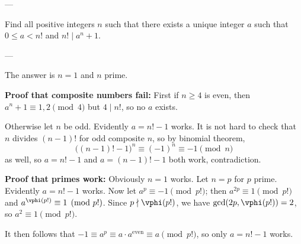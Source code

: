 
---

Find all positive integers $n$ such that there exists a unique integer $a$ such that $0\le a<n!$ and
$n!\mid a^n+1$.

---

The answer is $n=1$ and $n$ prime.

\bigskip

\textbf{Proof that composite numbers fail:} First if $n\ge4$ is even, then $a^n+1\equiv1,2\pmod4$ but $4\mid n!$, so no $a$ exists.

Otherwise let $n$ be odd. Evidently $a=n!-1$ works. It is not hard to check that $n$ divides $(n-1)!$ for odd composite $n$, so by binomial theorem,
\[\big( (n-1)!-1\big)^n\equiv(-1)^n\equiv-1\pmod n\]
as well, so $a=n!-1$ and $a=(n-1)!-1$ both work, contradiction.

\bigskip

\textbf{Proof that primes work:} Obviously $n=1$ works. Let $n=p$ for $p$ prime. Evidently $a=n!-1$ works. Now let $a^p\equiv-1\pmod{p!}$; then $a^{2p}\equiv1\pmod{p!}$ and $a^{\vphi(p!)}\equiv1\pmod{p!}$. Since $p\nmid\vphi(p!)$, we have $\gcd(2p,\vphi(p!))=2$, so $a^2\equiv1\pmod{p!}$.

It then follows that $-1\equiv a^p\equiv a\cdot a^{\text{even}}\equiv a\pmod{p!}$, so only $a=n!-1$ works.

